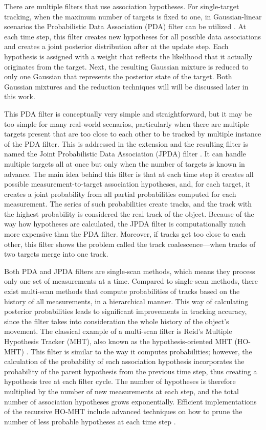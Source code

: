 There are multiple filters that use association hypotheses. For single-target tracking, when the maximum number of targets is fixed to one, in Gaussian-linear scenarios the Probabilistic Data Association (PDA) filter can be utilized \cite{bar-shalomProbabilisticDataAssociation2009}. At each time step, this filter creates new hypotheses for all possible data associations and creates a joint posterior distribution after at the update step. Each hypothesis is assigned with a weight that reflects the likelihood that it actually originates from the target. Next, the resulting Gaussian mixture is reduced to only one Gaussian that represents the posterior state of the target. Both Gaussian mixtures and the reduction techniques will will be discussed later in this work.

This PDA filter is conceptually very simple and straightforward, but it may be too simple for many real-world scenarios, particularly when there are multiple targets present that are too close to each other to be tracked by multiple instance of the PDA filter. This is addressed in the extension and the resulting filter is named the Joint Probabilistic Data Association (JPDA) filter \cite{bar-shalomMultitargetmultisensorTrackingPrinciples1995}. It can handle multiple targets all at once but only when the number of targets is known in advance. The main idea behind this filter is that at each time step it creates all possible measurement-to-target association hypotheses, and, for each target, it creates a joint probability from all partial probabilities computed for each measurement. The series of such probabilities create tracks, and the track with the highest probability is considered the real track of the object. Because of the way how hypotheses are calculated, the JPDA filter is computationally much more expensive than the PDA filter. Moreover, if tracks get too close to each other, this filter shows the problem called the track coalescence—when tracks of two targets merge into one track.

Both PDA and JPDA filters are single-scan methods, which means they process only one set of measurements at a time. Compared to single-scan methods, there exist multi-scan methods that compute probabilities of tracks based on the history of all measurements, in a hierarchical manner. This way of calculating posterior probabilities leads to significant improvements in tracking accuracy, since the filter takes into consideration the whole history of the object's movement. The classical example of a multi-scan filter is Reid's Multiple Hypothesis Tracker (MHT), also known as the hypothesis-oriented MHT (HO-MHT) \cite{reidAlgorithmTrackingMultiple1979}. This filter is similar to the way it computes probabilities; however, the calculation of the probability of each association hypothesis incorporates the probability of the parent hypothesis from the previous time step, thus creating a hypothesis tree at each filter cycle. The number of hypotheses is therefore multiplied by the number of new measurements at each step, and the total number of association hypotheses grows exponentially. Efficient implementations of the recursive HO-MHT include advanced techniques on how to prune the number of less probable hypotheses at each time step \cite{coxEfficientImplementationReid1996}.

